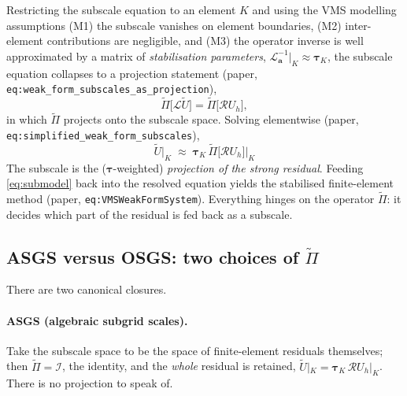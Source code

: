 \documentclass[11pt]{article}
\newcommand{\ba}{\boldsymbol{a}}
\newcommand{\Lop}{\mathcal{L}}
\newcommand{\Rop}{\mathcal{R}}
\newcommand{\Ptilde}{\widetilde{\Pi}}
\newcommand{\Util}{\widetilde{U}}
\theoremstyle{plain}
\theoremstyle{definition}
\theoremstyle{remark}
\begin{document}
Restricting the subscale equation to an element $K$ and using the VMS
modelling assumptions (M1) the subscale vanishes on element boundaries,
(M2) inter-element contributions are negligible, and (M3) the operator
inverse is well approximated by a matrix of \emph{stabilisation
parameters}, $\Lop_{\ba}^{-1}|_K\approx\bm{\tau}_K$, the subscale
equation collapses to a projection statement (paper,
\texttt{eq:weak\_form\_subscales\_as\_projection}),
%
\begin{equation}\label{eq:subprojection}
  \Ptilde\bigl[\Lop\Util\bigr]=\Ptilde\bigl[\Rop U_h\bigr],
\end{equation}
%
in which $\Ptilde$ projects onto the subscale space. Solving
elementwise (paper, \texttt{eq:simplified\_weak\_form\_subscales}),
%
\begin{equation}\label{eq:submodel}
  \boxed{\;\Util|_K
  \;\approx\;\bm{\tau}_K\,\Ptilde\bigl[\Rop U_h\bigr]\big|_K\;}
\end{equation}
%
The subscale is the ($\bm\tau$-weighted) \emph{projection of the strong
residual}. Feeding \cref{eq:submodel} back into the resolved equation
yields the stabilised finite-element method (paper,
\texttt{eq:VMSWeakFormSystem}). Everything hinges on the operator
$\Ptilde$: it decides which part of the residual is fed back as a
subscale.

\subsection{ASGS versus OSGS: two choices of \texorpdfstring{$\Ptilde$}{Pi}}

There are two canonical closures.

\paragraph{ASGS (algebraic subgrid scales).}
Take the subscale space to be the space of finite-element residuals
themselves; then $\Ptilde=\mathcal I$, the identity, and the
\emph{whole} residual is retained,
$\Util|_K=\bm\tau_K\,\Rop U_h|_K$. There is no projection to speak of.
\end{document}
